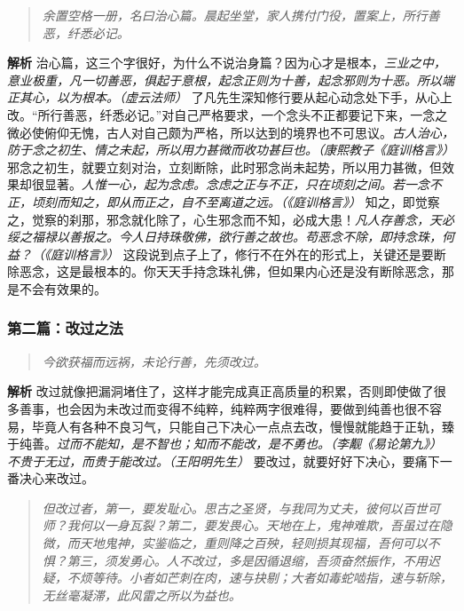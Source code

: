 \begin{quote}\it
    余置空格一册，名曰治心篇。晨起坐堂，家人携付门役，置案上，所行善恶，纤悉必记。
\end{quote}

\textbf{解析} 治心篇，这三个字很好，为什么不说治身篇？因为心才是根本，\textit{三业之中，意业极重，凡一切善恶，俱起于意根，起念正则为十善，起念邪则为十恶。所以端正其心，以为根本。（虚云法师）} 了凡先生深知修行要从起心动念处下手，从心上改。“所行善恶，纤悉必记。”对自己严格要求，一个念头不正都要记下来，一念之微必使俯仰无愧，古人对自己颇为严格，所以达到的境界也不可思议。\textit{古人治心，防于念之初生、情之未起，所以用力甚微而收功甚巨也。（康熙教子《庭训格言》）} 邪念之初生，就要立刻对治，立刻断除，此时邪念尚未起势，所以用力甚微，但效果却很显著。\textit{人惟一心，起为念虑。念虑之正与不正，只在顷刻之间。若一念不正，顷刻而知之，即从而正之，自不至离道之远。（《庭训格言》）} 知之，即觉察之，觉察的刹那，邪念就化除了，心生邪念而不知，必成大患！\textit{凡人存善念，天必绥之福禄以善报之。今人日持珠敬佛，欲行善之故也。苟恶念不除，即持念珠，何益？（《庭训格言》）} 这段说到点子上了，修行不在外在的形式上，关键还是要断除恶念，这是最根本的。你天天手持念珠礼佛，但如果内心还是没有断除恶念，那是不会有效果的。

\subsubsection{第二篇：改过之法}

\begin{quote}\it
    今欲获福而远祸，未论行善，先须改过。
\end{quote}

\textbf{解析} 改过就像把漏洞堵住了，这样才能完成真正高质量的积累，否则即使做了很多善事，也会因为未改过而变得不纯粹，纯粹两字很难得，要做到纯善也很不容易，毕竟人有各种不良习气，只能自己下决心一点点去改，慢慢就能趋于正轨，臻于纯善。\textit{过而不能知，是不智也；知而不能改，是不勇也。（李觏《易论第九》）} \textit{不贵于无过，而贵于能改过。（王阳明先生）} 要改过，就要好好下决心，要痛下一番决心来改过。

\begin{quote}\it
    但改过者，第一，要发耻心。思古之圣贤，与我同为丈夫，彼何以百世可师？我何以一身瓦裂？第二，要发畏心。天地在上，鬼神难欺，吾虽过在隐微，而天地鬼神，实鉴临之，重则降之百殃，轻则损其现福，吾何可以不惧？第三，须发勇心。人不改过，多是因循退缩，吾须奋然振作，不用迟疑，不烦等待。小者如芒刺在肉，速与抉剔；大者如毒蛇啮指，速与斩除，无丝毫凝滞，此风雷之所以为益也。
\end{quote}

